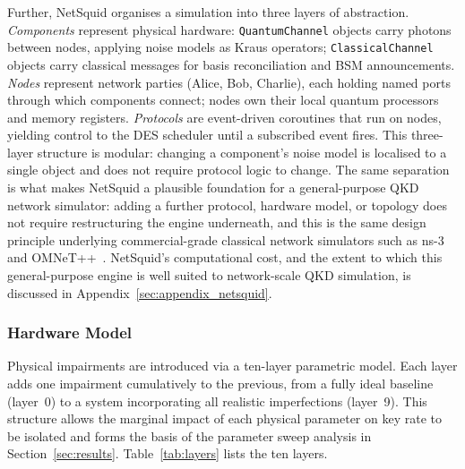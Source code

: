 \documentclass[12pt]{article}
\begin{document}
Further, NetSquid organises a simulation into three layers of abstraction. \textit{Components} represent physical hardware: \texttt{QuantumChannel} objects carry photons between nodes, applying noise models as Kraus operators; \texttt{ClassicalChannel} objects carry classical messages for basis reconciliation and BSM announcements. \textit{Nodes} represent network parties (Alice, Bob, Charlie), each holding named ports through which components connect; nodes own their local quantum processors and memory registers. \textit{Protocols} are event-driven coroutines that run on nodes, yielding control to the DES scheduler until a subscribed event fires. This three-layer structure is modular: changing a component's noise model is localised to a single object and does not require protocol logic to change. The same separation is what makes NetSquid a plausible foundation for a general-purpose QKD network simulator: adding a further protocol, hardware model, or topology does not require restructuring the engine underneath, and this is the same design principle underlying commercial-grade classical network simulators such as ns-3~\cite{henderson2008network} and OMNeT++~\cite{varga2001omnet++}. NetSquid's computational cost, and the extent to which this general-purpose engine is well suited to network-scale QKD simulation, is discussed in Appendix~\ref{sec:appendix_netsquid}.

\subsubsection{Hardware Model}
\label{sec:hardware_model}

Physical impairments are introduced via a ten-layer parametric model. Each layer adds one impairment cumulatively to the previous, from a fully ideal baseline (layer~0) to a system incorporating all realistic imperfections (layer~9). This structure allows the marginal impact of each physical parameter on key rate to be isolated and forms the basis of the parameter sweep analysis in Section~\ref{sec:results}. Table~\ref{tab:layers} lists the ten layers.
\end{document}
